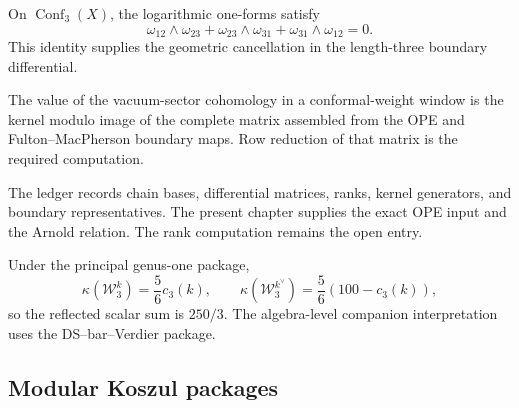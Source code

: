 \begin{computation}
\label{comp:w3-arnold-deg3}
\ClaimStatusProvedElsewhere
On \(\operatorname{Conf}_3(X)\), the logarithmic one-forms satisfy
\[
\omega_{12}\wedge\omega_{23}
+\omega_{23}\wedge\omega_{31}
+\omega_{31}\wedge\omega_{12}=0.
\]
This identity supplies the geometric cancellation in the
length-three boundary differential.
\end{computation}

\begin{proposition}
\label{prop:w3-deg3-vacuum}
\ClaimStatusOpen
The value of the vacuum-sector cohomology in a conformal-weight
window is the kernel modulo image of the complete matrix assembled
from the OPE and Fulton--MacPherson boundary maps.  Row reduction of
that matrix is the required computation.
\end{proposition}

\begin{computation}
\label{comp:w3-deg3-cohom}
\ClaimStatusOpen
The ledger records chain bases, differential matrices, ranks,
kernel generators, and boundary representatives.  The present
chapter supplies the exact OPE input and the Arnold relation.
The rank computation remains the open entry.
\end{computation}

\begin{computation}
\label{comp:w3-curvature-dual}
\ClaimStatusConditional
Under the principal genus-one package,
\[
\kappa(\mathcal W_3^k)=\frac56c_3(k),\qquad
\kappa(\mathcal W_3^{k^\vee})=\frac56(100-c_3(k)),
\]
so the reflected scalar sum is \(250/3\).  The algebra-level
companion interpretation uses the DS--bar--Verdier package.
\end{computation}

\subsection{Modular Koszul packages}

